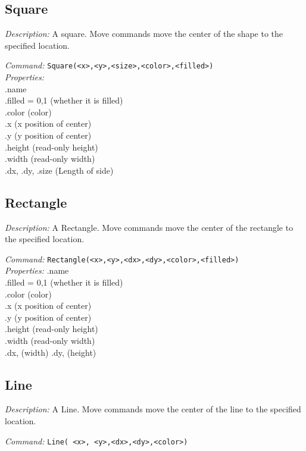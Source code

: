 \subsection{Square}

\emph{Description:} A square. Move commands move the center
  of the shape to the specified location.

\emph{Command:}  \verb+Square(<x>,<y>,<size>,<color>,<filled>)+\\

\emph{Properties:}\\
.name\\
.filled = 0,1 (whether it is filled)\\
.color (color) \\
.x  (x position of center) \\
.y  (y position of center)\\
.height (read-only height)\\
.width (read-only width)\\
.dx, .dy, .size  (Length of side)\\


\subsection{Rectangle}
\emph{Description:} A Rectangle. Move commands move the center
  of the rectangle to the specified location.

\emph{Command:}  \verb+Rectangle(<x>,<y>,<dx>,<dy>,<color>,<filled>)+\\

\emph{Properties:}
.name\\
.filled = {0,1} (whether it is filled)\\
.color (color) \\
.x  (x position of center) \\
.y  (y position of center)\\
.height (read-only height)\\
.width (read-only width)\\
.dx, (width)
.dy,  (height)\\



\subsection{Line}
\emph{Description:} A Line. Move commands move the center
  of the line to the specified location.

\emph{Command:}  \verb+Line( <x>, <y>,<dx>,<dy>,<color>)+\\

